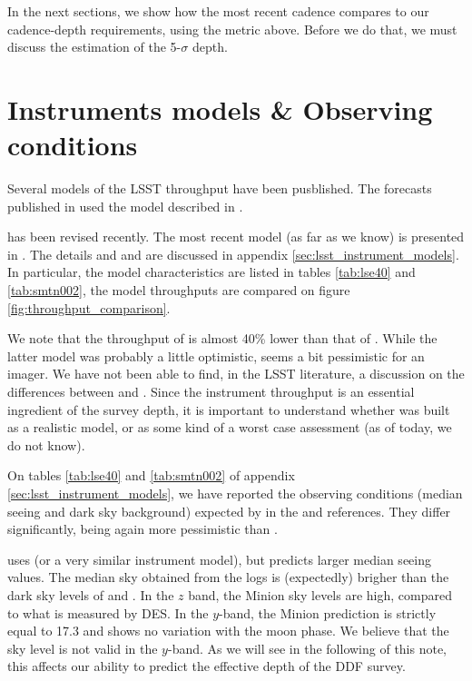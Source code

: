 \documentclass[\docopts]{\docclass}
\begin{document}
In the next sections, we show how the most recent 
cadence compares to our cadence-depth requirements, using the metric
above.  Before we do that, we must discuss the estimation of the
5-$\sigma$ depth. 


\section{Instruments models \& Observing conditions}
\label{sec:instrument_model_summary}

Several models of the LSST throughput have been pusblished.  The
forecasts published in \cite{2014A&A...572A..80A} used the model
described in \cite[][hereafter LSE-40]{LSE-40}. 

 has been revised recently. The most recent model (as far
as we know) is presented in \cite[][hereafter SMTN-002)]{SMTN-002}.
The details and  and  are discussed in
appendix \ref{sec:lsst_instrument_models}.  In particular, the model
characteristics are listed in tables \ref{tab:lse40} and
\ref{tab:smtn002}, the model throughputs are compared on figure
\ref{fig:throughput_comparison}.

We note that the throughput of  is almost 40\% lower
than that of .  While the latter model was probably a
little optimistic,  seems a bit pessimistic for an
imager.  We have not been able to find, in the LSST literature, a
discussion on the differences between  and
.  Since the instrument throughput is an essential
ingredient of the survey depth, it is important to understand whether
 was built as a realistic model, or as some kind of a
worst case assessment (as of today, we do not know).

On tables \ref{tab:lse40} and \ref{tab:smtn002} of appendix
\ref{sec:lsst_instrument_models}, we have reported the observing
conditions (median seeing and dark sky background) expected by in the
 and  references.  They differ
significantly,  being again more pessimistic than
.

 uses  (or a very similar instrument
model), but predicts larger median seeing values.  The median sky
obtained from the  logs is (expectedly) brigher
than the dark sky levels of  and . In the
$z$ band, the Minion sky levels are high, compared to what is measured
by DES.  In the $y$-band, the Minion prediction is strictly equal to
17.3 and shows no variation with the moon phase.  We believe that the
 sky level is not valid in the $y$-band. As we will
see in the following of this note, this affects our ability to predict
the effective depth of the DDF survey.
\end{document}
